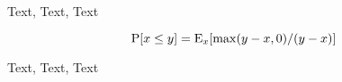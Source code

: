 \documentclass[12pt]{article}
\newenvironment{LRmath}{
  \def\E{}
  \renewcommand{\E}[2][]{\ensuremath\mathrm{E}_{##1}\!\left[##2\right]}
  \def\PP{\ensuremath\mathrm{P}}
}{}
\begin{document}
\begin{LRmath}

Text, Text, Text

\begin{equation}
    \PP[x\le y] = \E[x]{\max(y-x,0)/(y-x)}
\end{equation}

Text, Text, Text

\end{LRmath}
\end{document}
